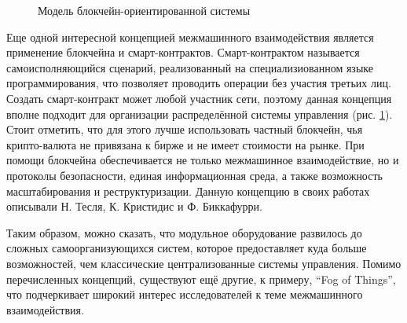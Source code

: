 \begin{figure}[ht]
	\caption{Модель блокчейн-ориентированной системы}\label{fig:bc-system}
\end{figure}

Еще одной интересной концепцией межмашинного взаимодействия является применение блокчейна и смарт-контрактов. Смарт-контрактом называется самоисполняющийся сценарий, реализованный на специализиованном языке программирования, что позволяет проводить операции без участия третьих лиц. Создать смарт-контракт может любой участник сети, поэтому данная концепция вполне подходит для организации распределённой системы управления (рис. \cref{fig:bc-system}). Стоит отметить, что для этого лучше использовать частный блокчейн, чья крипто-валюта не привязана к бирже и не имеет стоимости на рынке. При помощи блокчейна обеспечивается не только межмашинное взаимодействие, но и протоколы безопасности, единая информационная среда, а также возможность масштабирования и реструктуризации. Данную концепцию в своих работах описывали Н. Тесля, К. Кристидис и Ф. Биккафурри.

Таким образом, можно сказать, что модульное оборудование развилось до сложных самоорганизующихся систем, которое предоставляет куда больше возможностей, чем классические централизованные системы управления. Помимо перечисленных концепций, существуют ещё другие, к примеру, ``Fog of Things'', что подчеркивает широкий интерес исследователей к теме межмашинного взаимодействия.

